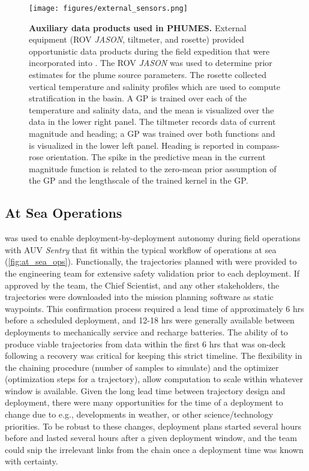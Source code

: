 \begin{figure}[h!]
    \centering
    \texttt{[image: figures/external\_sensors.png]}
    \caption[Auxiliary data products used in \PHUMES.]{\textbf{Auxiliary data products used in PHUMES.} External equipment (ROV \emph{JASON}, tiltmeter, and rosette) provided opportunistic data products during the field expedition that were incorporated into \PHUMES. The ROV \emph{JASON} was used to determine prior estimates for the plume source parameters. The rosette collected vertical temperature and salinity profiles which are used to compute stratification in the basin. A GP is trained over each of the temperature and salinity data, and the mean is visualized over the data in the lower right panel. The tiltmeter records data of current magnitude and heading; a GP was trained over both functions and is visualized in the lower left panel. Heading is reported in compass-rose orientation. The spike in the predictive mean in the current magnitude function is related to the zero-mean prior assumption of the GP and the lengthscale of the trained kernel in the GP.}
    \label{fig:ext_sensors}
\end{figure}


\subsection{At Sea Operations}
\PHORTEX was used to enable deployment-by-deployment autonomy during field operations with AUV \emph{Sentry} that fit within the typical workflow of operations at sea (\cref{fig:at_sea_ops}). Functionally, the trajectories planned with \PHORTEX were provided to the \Sentry engineering team for extensive safety validation prior to each deployment. If approved by the \Sentry team, the Chief Scientist, and any other stakeholders, the trajectories were downloaded into the \Sentry mission planning software as static waypoints. This confirmation process required a lead time of approximately 6 hrs before a scheduled deployment, and 12-18 hrs were generally available between deployments to mechanically service \Sentry and recharge batteries. The ability of \PHORTEX to produce viable trajectories from data within the first 6 hrs that \Sentry was on-deck following a recovery was critical for keeping this strict timeline. The flexibility in the \PHUMES chaining procedure (number of samples to simulate) and the \PHORTEX optimizer (optimization steps for a trajectory), allow computation to scale within whatever window is available. Given the long lead time between trajectory design and \Sentry deployment, there were many opportunities for the time of a deployment to change due to e.g., developments in weather, or other science/technology priorities. To be robust to these changes, deployment plans started several hours before and lasted several hours after a given deployment window, and the \Sentry team could snip the irrelevant links from the chain once a deployment time was known with certainty.

